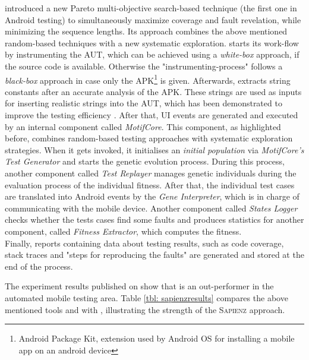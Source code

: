 \sapienz \cite{sapienz} introduced a new Pareto multi-objective search-based technique (the first one in Android testing) to simultaneously maximize coverage and fault revelation, while minimizing the sequence lengths. Its approach combines the above mentioned random-based techniques with a new systematic exploration. \sapienz starts its work-flow by instrumenting the AUT, which can be achieved using a \textit{white-box} approach, if the source code is available. Otherwise the "instrumenting-process" follows a \textit{black-box} approach in case only the APK\footnote{Android Package Kit, extension used by Android OS for installing a mobile app on an android device} is given.  
Afterwards, \sapienz extracts string constants after an accurate analysis of the APK. These strings are used as inputs for inserting realistic strings into the AUT, which has been demonstrated to improve the testing efficiency \cite{sapienz}. After that, UI events are generated and executed by an internal component called \textit{MotifCore}. 
This component, as highlighted before, combines random-based testing approaches with systematic exploration strategies. When it gets invoked, it initialises an \textit{initial population} via \textit{MotifCore's Test Generator} and starts the genetic evolution process. 
During this process, another component called \textit{Test Replayer} manages genetic individuals during the evaluation process of the individual fitness. After that, the individual test cases are translated into Android events by the \textit{Gene Interpreter}, which is in charge of communicating with the mobile device. 
Another component called \textit{States Logger} checks whether the tests cases find some faults and produces statistics for another component, called \textit{Fitness Extractor}, which computes the fitness. \\
Finally, reports containing data about testing results, such as code coverage, stack traces and "steps for reproducing the faults" are generated and stored at the end of the process.  


The experiment results published on \cite{sapienz} show that \sapienz is an out-performer in the automated mobile testing area. Table \ref{tbl: sapienzresults} compares the above mentioned tools \monkey and \dynodroid with \sapienz, illustrating the strength of the \textsc{Sapienz} approach. 

